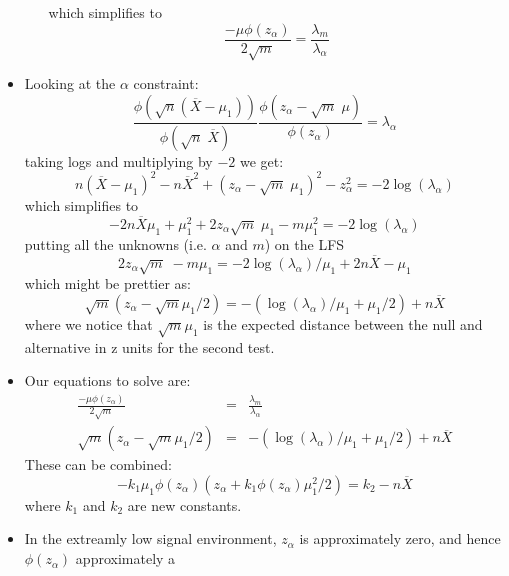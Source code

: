 \documentclass{article}
\begin{document}
\begin{itemize}
\begin{itemize}
which simplifies to 
\begin{displaymath}
\frac{-\mu \phi(z_\alpha)}{2 \sqrt{m}} = \frac{\lambda_m}{\lambda_\alpha}
\end{displaymath}
\end{itemize}
\item Looking at the $\alpha$ constraint:
\begin{displaymath}
\frac{\phi(\sqrt{n}(\overline{X} -
\mu_1))}{\phi(\sqrt{n}\;\overline{X})} 
\frac{\phi(z_\alpha - \sqrt{m} \; \mu)}{\phi(z_\alpha)} = \lambda_\alpha
\end{displaymath}
taking logs and multiplying by $-2$ we get:
\begin{displaymath}
n(\overline{X} - \mu_1)^2 - n\overline{X}^2 + (z_\alpha - \sqrt{m} \;
\mu_1)^2 - z_\alpha^2 = -2 \log(\lambda_\alpha)
\end{displaymath}
which simplifies to
\begin{displaymath}
- 2 n \overline{X}\mu_1 + \mu_1^2 + 2 z_\alpha \sqrt{m} \;
\mu_1 - m \mu_1^2 =  -2 \log(\lambda_\alpha)
\end{displaymath}
putting all the unknowns (i.e. $\alpha$ and $m$) on the LFS
\begin{displaymath}
2 z_\alpha \sqrt{m} \;
 - m \mu_1 =  -2 \log(\lambda_\alpha)/\mu_1 + 2 n \overline{X} -  \mu_1
\end{displaymath}
which might be prettier as:
\begin{displaymath}
\sqrt{m}(z_\alpha  - \sqrt{m} \mu_1/2) =  - (\log(\lambda_\alpha)/\mu_1
+ \mu_1/2) +  n \overline{X}
\end{displaymath}
where we notice that $\sqrt{m}\mu_1$ is the expected distance between the
null and alternative in z units for the second test.  
\item Our equations to solve are:
\begin{eqnarray}
\frac{-\mu \phi(z_\alpha)}{2 \sqrt{m}} &=&
\frac{\lambda_m}{\lambda_\alpha} \\
\sqrt{m}(z_\alpha  - \sqrt{m} \mu_1/2) &= & - (\log(\lambda_\alpha)/\mu_1
+ \mu_1/2) +  n \overline{X}
\end{eqnarray}
These can be combined:
\begin{displaymath}
- k_1 \mu_1 \phi(z_\alpha) (z_\alpha  + k_1 \phi(z_\alpha) \mu^2_1/2) = k_2 -  n \overline{X}
\end{displaymath}
where $k_1$ and $k_2$ are new constants.
\item In the extreamly low signal environment, $z_\alpha$ is
approximately zero, and hence $\phi(z_\alpha)$ approximately a

\end{itemize}
\end{document}
